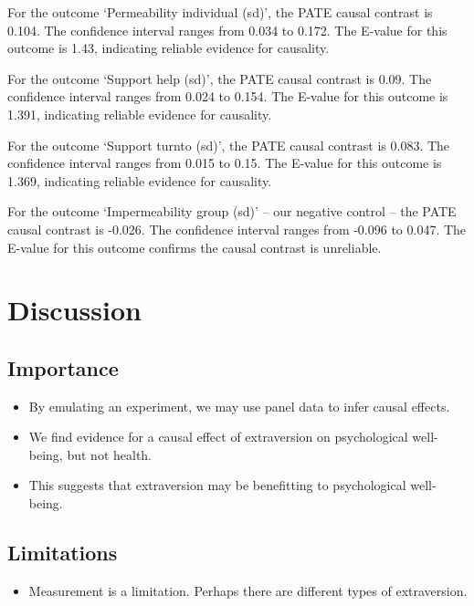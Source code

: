 \documentclass[
  singlecolumn]{report}
\providecommand{\tightlist}{%
  \setlength{\itemsep}{0pt}\setlength{\parskip}{0pt}}\usepackage{longtable,booktabs,array}
\begin{document}
For the outcome `Permeability individual (sd)', the PATE causal contrast
is 0.104. The confidence interval ranges from 0.034 to 0.172. The
E-value for this outcome is 1.43, indicating reliable evidence for
causality.

For the outcome `Support help (sd)', the PATE causal contrast is 0.09.
The confidence interval ranges from 0.024 to 0.154. The E-value for this
outcome is 1.391, indicating reliable evidence for causality.

For the outcome `Support turnto (sd)', the PATE causal contrast is
0.083. The confidence interval ranges from 0.015 to 0.15. The E-value
for this outcome is 1.369, indicating reliable evidence for causality.

For the outcome `Impermeability group (sd)' -- our negative control --
the PATE causal contrast is -0.026. The confidence interval ranges from
-0.096 to 0.047. The E-value for this outcome confirms the causal
contrast is unreliable.

\hypertarget{discussion}{%
\section{Discussion}\label{discussion}}

\hypertarget{importance}{%
\subsection{Importance}\label{importance}}

\begin{itemize}
\tightlist
\item
  By emulating an experiment, we may use panel data to infer causal
  effects.
\item
  We find evidence for a causal effect of extraversion on psychological
  well-being, but not health.
\item
  This suggests that extraversion may be benefitting to psychological
  well-being.
\end{itemize}

\hypertarget{limitations}{%
\subsection{Limitations}\label{limitations}}

\begin{itemize}
\tightlist
\item
  Measurement is a limitation. Perhaps there are different types of
  extraversion.
\end{itemize}
\end{document}
